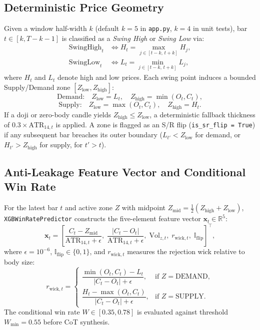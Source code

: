 \documentclass[conference]{IEEEtran}
\begin{document}
\subsection{Deterministic Price Geometry}
Given a window half-width $k$ (default $k = 5$ in \texttt{app.py}, $k = 4$ in unit tests), bar $t \in [k, T - k - 1]$ is classified as a \textit{Swing High} or \textit{Swing Low} via:
\begin{align}
\text{SwingHigh}_t &\iff H_t = \max_{j \in [t-k,\, t+k]} H_j, \\
\text{SwingLow}_t  &\iff L_t = \min_{j \in [t-k,\, t+k]} L_j,
\end{align}
where $H_t$ and $L_t$ denote high and low prices. Each swing point induces a bounded Supply/Demand zone $[Z_{\text{low}}, Z_{\text{high}}]$:
\begin{equation}
\text{Demand:} \quad Z_{\text{low}} = L_t, \quad Z_{\text{high}} = \min(O_t, C_t),
\end{equation}
\begin{equation}
\text{Supply:} \quad Z_{\text{low}} = \max(O_t, C_t), \quad Z_{\text{high}} = H_t.
\end{equation}
If a doji or zero-body candle yields $Z_{\text{high}} \le Z_{\text{low}}$, a deterministic fallback thickness of $0.3 \times \text{ATR}_{14,t}$ is applied. A zone is flagged as an S/R flip (\texttt{is\_sr\_flip = True}) if any subsequent bar breaches its outer boundary ($L_{t'} < Z_{\text{low}}$ for demand, or $H_{t'} > Z_{\text{high}}$ for supply, for $t' > t$).

\subsection{Anti-Leakage Feature Vector and Conditional Win Rate}
For the latest bar $t$ and active zone $Z$ with midpoint $Z_{\text{mid}} = \frac{1}{2}(Z_{\text{high}} + Z_{\text{low}})$, \texttt{XGBWinRatePredictor} constructs the five-element feature vector $\mathbf{x}_t \in \mathbb{R}^5$:
\begin{equation}
\mathbf{x}_t = \left[
\frac{C_t - Z_{\text{mid}}}{\text{ATR}_{14,t} + \epsilon},\;
\frac{|C_t - O_t|}{\text{ATR}_{14,t} + \epsilon},\;
\text{Vol}_{z,t},\;
r_{\text{wick},t},\;
\mathbb{I}_{\text{flip}}
\right]^\top,
\end{equation}
where $\epsilon = 10^{-6}$, $\mathbb{I}_{\text{flip}} \in \{0, 1\}$, and $r_{\text{wick},t}$ measures the rejection wick relative to body size:
\begin{equation}
r_{\text{wick},t} =
\begin{cases}
\dfrac{\min(O_t, C_t) - L_t}{|C_t - O_t| + \epsilon}, & \text{if } Z = \text{DEMAND}, \\[8pt]
\dfrac{H_t - \max(O_t, C_t)}{|C_t - O_t| + \epsilon}, & \text{if } Z = \text{SUPPLY}.
\end{cases}
\end{equation}
The conditional win rate $W \in [0.35, 0.78]$ is evaluated against threshold $W_{\min} = 0.55$ before CoT synthesis.
\end{document}
